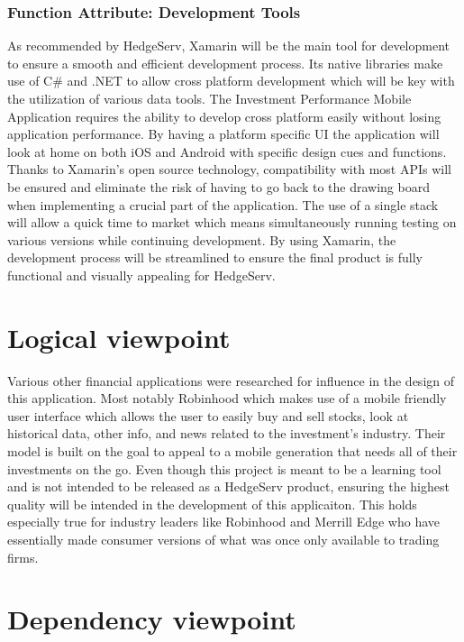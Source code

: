 \documentclass[onecolumn, draftclsnofoot,10pt, compsoc]{IEEEtran}
\begin{document}
\subsubsection{Function Attribute: Development Tools}
    As recommended by HedgeServ, Xamarin will be the main tool for development to ensure a smooth and efficient development process. Its native libraries make use of C\# and .NET to allow cross platform
    development which will be key with the utilization of various data tools. The Investment Performance Mobile Application requires the ability to develop cross platform easily without losing 
    application performance. By having a platform specific UI the application will look at home on both iOS and Android with specific design cues and functions. Thanks to Xamarin's open source technology,
    compatibility with most APIs will be ensured and eliminate the risk of having to go back to the drawing board when implementing a crucial part of the application. The use of a single stack will allow 
    a quick time to market which means simultaneously running testing on various versions while continuing development. By using Xamarin, the development process will be streamlined to ensure the final product
    is fully functional and visually appealing for HedgeServ. 


\section{Logical viewpoint}
        Various other financial applications were researched for influence in the design of this application. Most notably Robinhood which makes use of a mobile friendly user interface which allows the user to
	easily buy and sell stocks, look at historical data, other info, and news related to the investment's industry. Their model is built on the goal to appeal to a mobile generation that needs all of their
	investments on the go. Even though this project is meant to be a learning tool and is not intended to be released as a HedgeServ product, ensuring the highest quality will be intended in the development
	of this applicaiton. This holds especially true for industry leaders like Robinhood and Merrill Edge who have essentially made consumer versions of what was once only available to trading firms. 
     
\section{Dependency viewpoint}
\end{document}
